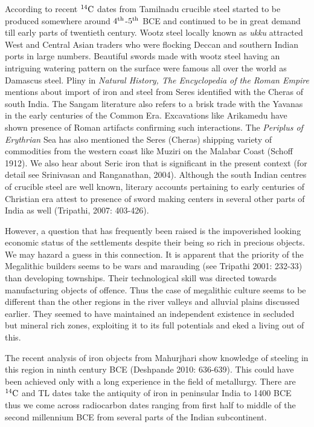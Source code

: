 According to recent $^{14}{\rm C}$ dates from Tamilnadu crucible steel started to be produced somewhere around $4^{\rm th}$-$5^{\rm th}$ BCE and continued to be in great demand till early parts of twentieth century. Wootz steel locally known as \textit{ukku} attracted West and Central Asian traders who were flocking Deccan and southern Indian ports in large numbers. Beautiful swords made with wootz steel having an intriguing watering pattern on the surface were famous all over the world as Damascus steel. Pliny in \textit{Natural History, The Encyclopedia of the Roman Empire} mentions about import of iron and steel from Seres identified with the Cheras of south India. The Sangam literature also refers to a brisk trade with the Yavanas in the early centuries of the Common Era. Excavations like Arikamedu have shown presence of Roman artifacts confirming such interactions. The \textit{Periplus of Erythrian} Sea has also mentioned the Seres (Cheras) shipping variety of commodities from the western coast like Muziri on the Malabar Coast (Schoff 1912). We also hear about Seric iron that is significant in the present context (for detail see Srinivasan and Ranganathan, 2004). Although the south Indian centres of crucible steel are well known, literary accounts pertaining to early centuries of Christian era attest to presence of sword making centers in several other parts of India as well (Tripathi, 2007: 403-426). 

However, a question that has frequently been raised is the impoverished looking economic status of the settlements despite their being so rich in precious objects. We may hazard a guess in this connection. It is apparent that the priority of the Megalithic builders seems to be wars and marauding (see Tripathi 2001: 232-33) than developing townships. Their technological skill was directed towards manufacturing objects of offence. Thus the case of megalithic culture seems to be different than the other regions in the river valleys and alluvial plains discussed earlier. They seemed to have maintained an independent existence in secluded but mineral rich zones, exploiting it to its full potentials and eked a living out of this.

The recent analysis of iron objects from Mahurjhari show knowledge of steeling in this region in ninth century BCE (Deshpande 2010: 636-639). This could have been achieved only with a long experience in the field of metallurgy. There are $^{14}{\rm C}$ and TL dates take the antiquity of iron in peninsular India to 1400 BCE  thus we come across radiocarbon dates ranging from first half to middle of the second millennium BCE from several parts of the Indian subcontinent.

